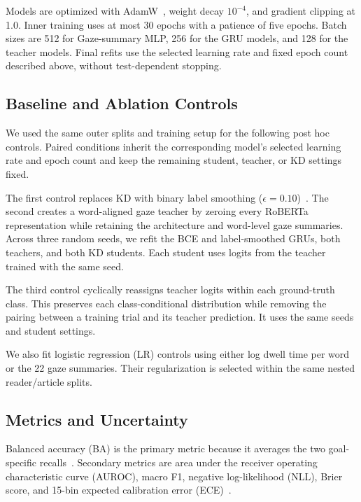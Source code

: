 \documentclass[conference,letterpaper]{IEEEtran}
\newcommand{\modelStats}{Gaze-summary MLP}
\begin{document}
Models are optimized with AdamW~\cite{loshchilov2019adamw}, weight decay
$10^{-4}$, and gradient clipping at 1.0.  Inner training uses at most 30 epochs
with a patience of five epochs.  Batch sizes are 512 for \modelStats{}, 256 for
the GRU models, and 128 for the teacher models.  Final refits use the selected
learning rate and fixed epoch count described above, without test-dependent
stopping.

\subsection{Baseline and Ablation Controls}
\label{sec:controls}

We used the same outer splits and training setup for the following post hoc
controls.  Paired conditions inherit the corresponding model's selected
learning rate and epoch count and keep the remaining student, teacher, or KD
settings fixed.

The first control replaces KD with binary label smoothing
($\epsilon=0.10$)~\cite{szegedy2016label}.  The second creates a word-aligned
gaze teacher by zeroing every RoBERTa representation while retaining the
architecture and word-level gaze summaries.  Across three random seeds, we
refit the BCE and label-smoothed GRUs, both teachers, and both KD students.
Each student uses logits from the teacher trained with the same seed.

The third control cyclically reassigns teacher logits within each ground-truth
class.  This preserves each class-conditional distribution while removing the
pairing between a training trial and its teacher prediction.  It uses the same
seeds and student settings.

We also fit logistic regression (LR) controls using either log dwell time per
word~\cite{shubi2025decoding} or the 22 gaze summaries.  Their regularization
is selected within the same nested reader/article splits.

\subsection{Metrics and Uncertainty}

Balanced accuracy (BA) is the primary metric because it averages the two
goal-specific recalls~\cite{brodersen2010balanced}.  Secondary metrics are
area under the receiver operating characteristic curve (AUROC), macro F1,
negative log-likelihood (NLL), Brier score, and 15-bin expected calibration
error (ECE)~\cite{guo2017calibration}.
\end{document}
